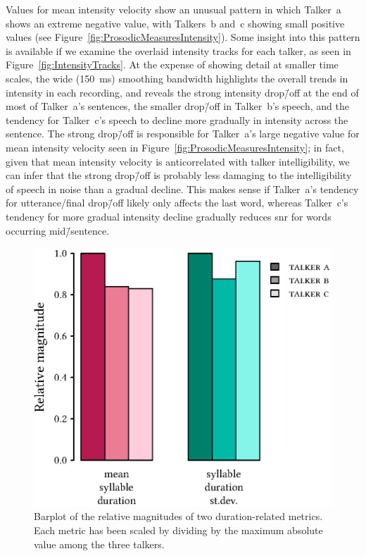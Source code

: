 Values for mean intensity velocity show an unusual pattern in which Talker~\ac{a} shows an extreme negative value, with Talkers~\ac{b} and~\ac{c} showing small positive values (see Figure~\ref{fig:ProsodicMeasuresIntensity}).  Some insight into this pattern is available if we examine the overlaid intensity tracks for each talker, as seen in Figure~\ref{fig:IntensityTracks}.  At the expense of showing detail at smaller time scales, the wide (150~ms) smoothing bandwidth highlights the overall trends in intensity in each recording, and reveals the strong intensity drop\=/off at the end of most of Talker~\ac{a}’s sentences, the smaller drop\=/off in Talker~\ac{b}’s speech, and the tendency for Talker~\ac{c}’s speech to decline more gradually in intensity across the sentence.  The strong drop\=/off is responsible for Talker~\ac{a}’s large negative value for mean intensity velocity seen in Figure~\ref{fig:ProsodicMeasuresIntensity}; in fact, given that mean intensity velocity is anticorrelated with talker intelligibility, we can infer that the strong drop\=/off is probably less damaging to the intelligibility of speech in noise than a gradual decline.  This makes sense if Talker~\ac{a}’s tendency for utterance\-/final drop\=/off likely only affects the last word, whereas Talker~\ac{c}’s tendency for more gradual intensity decline gradually reduces \ac{snr} for words occurring mid\=/sentence.

\begin{figure}[bt]
	\begin{centering}
	\includegraphics{figures/posthocs/SyllableDuration.eps}
	\caption[Barplot of duration metrics]{Barplot of the relative magnitudes of two duration-related metrics.  Each metric has been scaled by dividing by the maximum absolute value among the three talkers.\label{fig:SyllableDuration}}
	\end{centering}
\end{figure}

